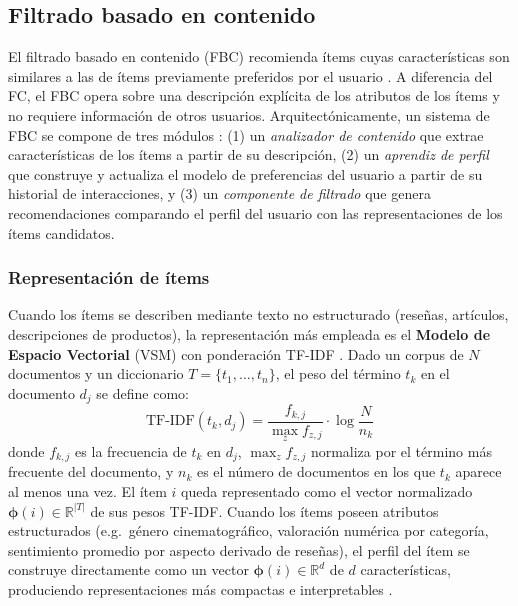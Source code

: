 \subsection{Filtrado basado en contenido} \label{subsec:cbf}

El filtrado basado en contenido (FBC) recomienda ítems cuyas características son similares a las de ítems previamente preferidos por el usuario \citep{pazzani_content_2007}. A diferencia del FC, el FBC opera sobre una descripción explícita de los atributos de los ítems y no requiere información de otros usuarios. Arquitectónicamente, un sistema de FBC se compone de tres módulos \citep{lops_content-based_2011}: (1) un \textit{analizador de contenido} que extrae características de los ítems a partir de su descripción, (2) un \textit{aprendiz de perfil} que construye y actualiza el modelo de preferencias del usuario a partir de su historial de interacciones, y (3) un \textit{componente de filtrado} que genera recomendaciones comparando el perfil del usuario con las representaciones de los ítems candidatos.

\subsubsection*{Representación de ítems}

Cuando los ítems se describen mediante texto no estructurado (reseñas, artículos, descripciones de productos), la representación más empleada es el \textbf{Modelo de Espacio Vectorial} (VSM) con ponderación TF-IDF \citep{lops_content-based_2011, aggarwal_recommender_2016}. Dado un corpus de $N$ documentos y un diccionario $T = \{t_1, \ldots, t_n\}$, el peso del término $t_k$ en el documento $d_j$ se define como:
\begin{equation} \label{eq:tfidf}
	\text{TF-IDF}(t_k, d_j) = \frac{f_{k,j}}{\max_z f_{z,j}} \cdot \log \frac{N}{n_k}
\end{equation}
donde $f_{k,j}$ es la frecuencia de $t_k$ en $d_j$, $\max_z f_{z,j}$ normaliza por el término más frecuente del documento, y $n_k$ es el número de documentos en los que $t_k$ aparece al menos una vez. El ítem $i$ queda representado como el vector normalizado $\boldsymbol{\phi}(i) \in \mathbb{R}^{|T|}$ de sus pesos TF-IDF. Cuando los ítems poseen atributos estructurados (e.g.\ género cinematográfico, valoración numérica por categoría, sentimiento promedio por aspecto derivado de reseñas), el perfil del ítem se construye directamente como un vector $\boldsymbol{\phi}(i) \in \mathbb{R}^d$ de $d$ características, produciendo representaciones más compactas e interpretables \citep{zhang_explicit_2014}.

